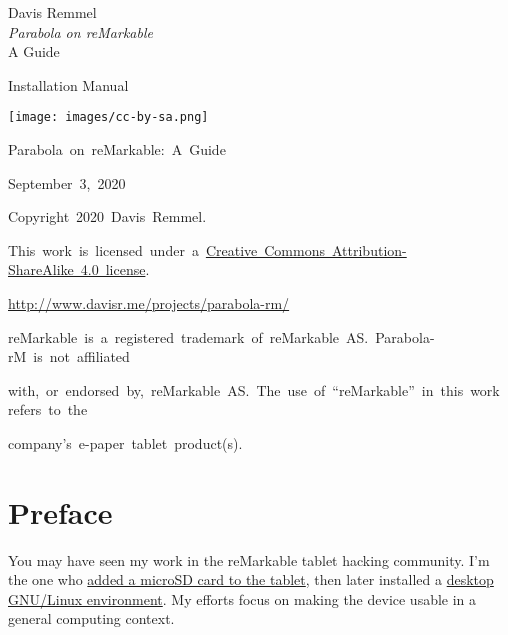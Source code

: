 \documentclass{memoir}
\newcommand*{\titleTH}{\begingroup%
  \thispagestyle{empty}
  \raggedleft
  \vspace*{\baselineskip}
  {\Large Davis Remmel}\\[0.167\textheight]
  {\textcolor{parapurp}{\Huge \textit{Parabola on reMarkable}}}\\[\baselineskip]
  {\small A Guide}\par
  \vfill{\Large Installation Manual}\par
  \vspace*{3\baselineskip}
  \endgroup}
\begin{document}
\footnotesinmargin
{}

\titleTH
\newpage
\ClearWallPaper

\thispagestyle{empty}

\mbox{}

\vfill

\texttt{[image: images/cc-by-sa.png]}
\vspace{0.5cm}

\small
\mbox{Parabola on reMarkable: A Guide}

\mbox{September 3, 2020}

\vspace{0.5cm}

\mbox{Copyright \textcopyright{} 2020 Davis Remmel.}

\mbox{This work is licensed under a \href{https://creativecommons.org/licenses/by-sa/4.0/legalcode}{Creative Commons Attribution-ShareAlike 4.0 license}.}

\mbox{\href{http://www.davisr.me/projects/parabola-rm/}{http://www.davisr.me/projects/parabola-rm/}}

\vspace{0.5cm}

\mbox{reMarkable\textregistered{} is a registered trademark of reMarkable AS. Parabola-rM is not affiliated}

\mbox{with, or endorsed by, reMarkable AS. The use of ``reMarkable'' in this work refers to the}

\mbox{company's e-paper tablet product(s).}

\newpage


\begingroup
\hypersetup{linkcolor=.}
\tableofcontents
\endgroup
\newpage

\thispagestyle{empty}\mbox{}\newpage


\renewcommand{\thechapter}{\roman{chapter}}
\chapter{Preface}

You may have seen my work in the reMarkable tablet hacking community. I’m the one who \href{http://www.davisr.me/projects/remarkable-microsd/}{added a microSD card to the tablet}, then later installed a \href{https://old.reddit.com/r/RemarkableTablet/comments/gkktxy/desktop_linux_on_remarkable_xournal_doom_and_more/}{desktop GNU/Linux environment}. My efforts focus on making the device usable in a general computing context.
\end{document}
